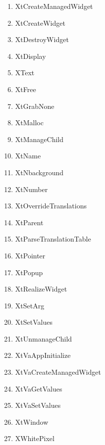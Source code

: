 \documentclass[twoside]{article}
\begin{document}
\begin{enumerate}
\begin{multicols}{2}
\begin{enumerate}
\item XtCreateManagedWidget
\item XtCreateWidget
\item XtDestroyWidget
\item XtDisplay
\item XText
\item XtFree
\item XtGrabNone
\item XtMalloc
\item XtManageChild
\item XtName
\item XtNbackground
\item XtNumber
\item XtOverrideTranslations
\item XtParent
\item XtParseTranslationTable
\item XtPointer
\item XtPopup
\item XtRealizeWidget
\item XtSetArg
\item XtSetValues
\item XtUnmanageChild
\item XtVaAppInitialize
\item XtVaCreateManagedWidget
\item XtVaGetValues
\item XtVaSetValues
\item XtWindow
\item XWhitePixel
\end{enumerate}
\end{multicols}


\end{enumerate}
\end{document}
